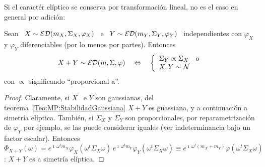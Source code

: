 Si el  caract\'er el\'iptico se conserva  por transformaci\'on lineal,  no es el
caso en general por adici\'on:
%
\begin{teorema}
  Sean   \    $X   \sim   \mathcal{ED}(m_X,\Sigma_X,\varphi_X)$    \   e   \    $Y   \sim
  \mathcal{ED}(m_Y,\Sigma_Y,\varphi_Y)$  \ independientes  con $\varphi_X$  y $\varphi_Y$
  diferenciables (por lo menos por partes). Entonces
  \[
  X + Y \sim \mathcal{ED}(m,\Sigma,\varphi) \quad \Leftrightarrow \quad \left\{
    \begin{array}{l}  \Sigma_Y  \propto  \Sigma_X  \quad \mbox{o}\\  X,  Y  \sim
      \mathcal{N} \end{array} \right.
  \]
  con $\propto$ significando ``proporcional a''.
  \end{teorema}
\begin{proof}
  Claramente,     si     $X$     \     e     $Y$     son     gaussianas,     del
  teorema~\ref{Teo:MP:StabilidadGaussiana}    $X+Y$    es    guassiana,   y    a
  continuaci\'on a simetr\'ia el\'iptica.  Tambi\'en, si $\Sigma_X$ y $\Sigma_Y$
  son proporcionales, por reparametrizaci\'on de $\varphi_Y$ por ejemplo, se las
  puede  considerar  iguales  (ver  indeterminancia  bajo  un  factor  escalar).
  Entonces  $\Phi_{X+Y}(\omega)  = e^{\imath  \,  \omega^t m_X}  \varphi_X\left(
    \omega^t   \Sigma_X   \omega\right)    \,   e^{\imath   \,   \omega^t   m_Y}
  \varphi_Y\left( \omega^t  \Sigma_X \omega\right) \equiv  e^{\imath \, \omega^t
    (m_X+m_Y)}  \varphi\left(  \omega^t  \Sigma_X  \omega\right)$:  $X+Y$  es  a
  simetr\'ia el\'iptica.


\end{proof}
